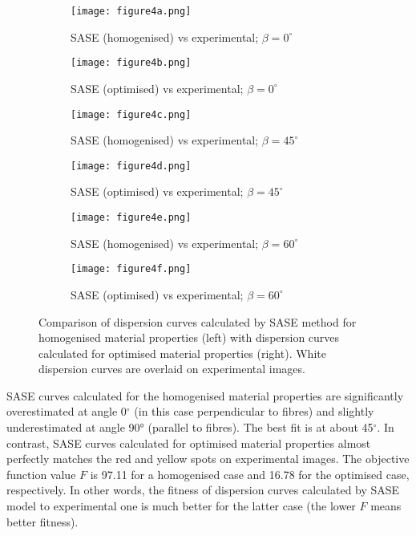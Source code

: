 \documentclass[preprint,12pt]{elsarticle}
\begin{document}
\begin{figure} [h!]
	\centering
	\begin{subfigure}[b]{0.47\textwidth}
		\centering
		\texttt{[image: figure4a.png]}
		\caption{SASE (homogenised) vs experimental; $\beta=0^{\circ}$}
		\label{fig:dispersion0deg_homog}
	\end{subfigure}
	\hfill
	\begin{subfigure}[b]{0.47\textwidth}
		\centering
		\texttt{[image: figure4b.png]}
		\caption{SASE (optimised) vs experimental; $\beta=0^{\circ}$}
		\label{fig:dispersion0deg_opt}
	\end{subfigure}
	\hfill
	\begin{subfigure}[b]{0.47\textwidth}
		\centering
		\texttt{[image: figure4c.png]}
		\caption{SASE (homogenised) vs experimental; $\beta=45^{\circ}$}
		\label{fig:dispersion45deg_homog}
	\end{subfigure}
	\hfill
	\begin{subfigure}[b]{0.47\textwidth}
		\centering
		\texttt{[image: figure4d.png]}
		\caption{SASE (optimised) vs experimental; $\beta=45^{\circ}$}
		\label{fig:dispersion45deg_opt}
	\end{subfigure}
	\hfill
	\begin{subfigure}[b]{0.47\textwidth}
		\centering
		\texttt{[image: figure4e.png]}
		\caption{SASE (homogenised) vs experimental; $\beta=60^{\circ}$}
		\label{fig:dispersion60deg_homog}
	\end{subfigure}
	\hfill
	\begin{subfigure}[b]{0.47\textwidth}
		\centering
		\texttt{[image: figure4f.png]}
		\caption{SASE (optimised) vs experimental; $\beta=60^{\circ}$}
		\label{fig:dispersion60deg_opt}
	\end{subfigure}
	\caption{Comparison of dispersion curves calculated by SASE method for homogenised material properties (left) with dispersion curves calculated for optimised material properties (right). White dispersion curves are overlaid on experimental images.}
	\label{fig:homog_opt}
\end{figure}



SASE curves calculated for the homogenised material properties are significantly overestimated at angle 0\(^{\circ}\) (in this case perpendicular to fibres) and slightly underestimated at angle 90° (parallel to fibres). 
The best fit is at about 45\(^{\circ}\). 
In contrast, SASE curves calculated for optimised material properties almost perfectly matches the red and yellow spots on experimental images. 
The objective function value $F$ is 97.11 for a homogenised case and 16.78 for the optimised case, respectively. 
In other words, the fitness of dispersion curves calculated by SASE model to experimental one is much better for the latter case (the lower $F$ means better fitness).
\end{document}
